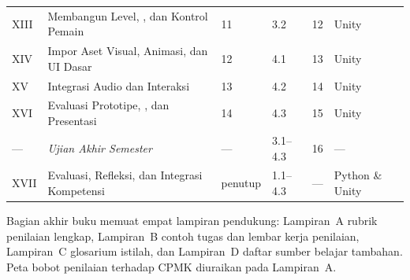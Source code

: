 \begin{table}[htbp]
{\begin{tabularx}{\textwidth}{@{}C{1.2cm} L{4.3cm} C{1.5cm} C{1.8cm} C{1.5cm} Y@{}}
XIII& Membangun Level, , dan Kontrol Pemain & 11 & 3.2 & 12 & Unity \\
XIV & Impor Aset Visual, Animasi, dan UI Dasar & 12 & 4.1 & 13 & Unity \\
XV  & Integrasi Audio dan  Interaksi & 13 & 4.2 & 14 & Unity \\
XVI & Evaluasi Prototipe, , dan Presentasi & 14 & 4.3 & 15 & Unity \\
---  & \itshape Ujian Akhir Semester & --- & 3.1--4.3 & 16 & --- \\
XVII& Evaluasi, Refleksi, dan Integrasi Kompetensi & penutup & 1.1--4.3 & --- & Python \& Unity \\
\bottomrule
\end{tabularx}}
\end{table}

\begin{catatabox}
Bagian akhir buku memuat empat lampiran pendukung: Lampiran~A rubrik
penilaian lengkap, Lampiran~B contoh tugas dan lembar kerja penilaian,
Lampiran~C glosarium istilah, dan Lampiran~D daftar sumber belajar
tambahan. Peta bobot penilaian terhadap CPMK diuraikan pada Lampiran~A.
\end{catatabox}

\clearpage
